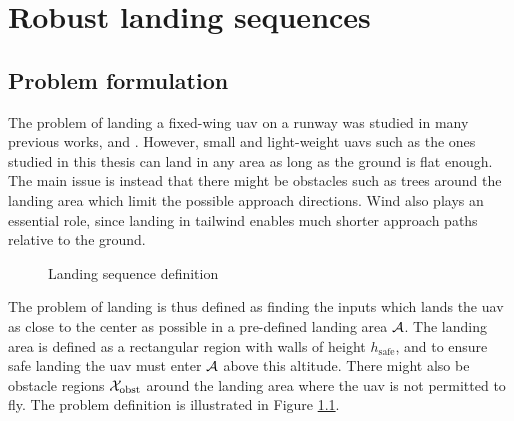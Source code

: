 \chapter{Robust landing sequences}\label{cha:landing}
\section{Problem formulation}
The problem of landing a fixed-wing \ac{uav} on a runway was studied in many previous works, \eg \cite{emergency_landing} and \cite{landing_on_vehicle}. However, small and light-weight \acp{uav} such as the ones studied 
in this thesis can land in any area as long as the ground is flat enough. The main issue is instead that there might be obstacles such as trees around the landing area which limit the possible 
approach directions. Wind also plays an essential role, since landing in tailwind enables much shorter approach paths relative to the ground.

\begin{figure}
    \begin{center}
    \end{center}
    \caption{Landing sequence definition}
    \label{fig:land}          
\end{figure}

The problem of landing is thus defined as finding the inputs which lands the \ac{uav} as close to the center as possible in a pre-defined landing area $\mathcal{A}$. The landing area is 
defined as a rectangular region with walls of height $h_{\text{safe}}$, and to ensure safe landing the \ac{uav} must enter $\mathcal{A}$ above this altitude. 
There might also be obstacle regions $\mathcal{X}_{\text{obst}}$ around the landing area where the \ac{uav} is not permitted to fly. The problem definition is illustrated in Figure \ref{fig:land}.

